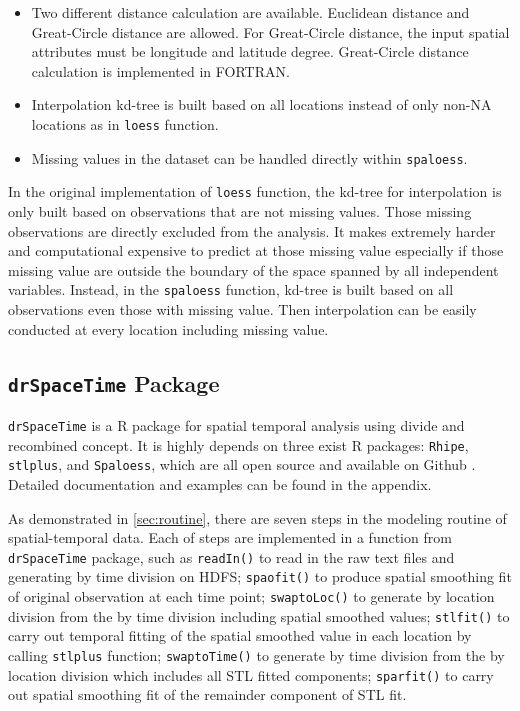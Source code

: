 \begin{itemize}
\item Two different distance calculation are available. Euclidean distance and 
Great-Circle distance are allowed. For Great-Circle distance, the input spatial 
attributes must be longitude and latitude degree. Great-Circle distance 
calculation is implemented in FORTRAN.
\item Interpolation kd-tree is built based on all locations instead of only 
non-NA locations as in \texttt{loess} function. 
\item Missing values in the dataset can be handled directly within 
\texttt{spaloess}. 
\end{itemize}

In the original implementation of \texttt{loess} function, the kd-tree 
\cite{bentley1980multidimensional} for 
interpolation is only built based on observations that are not missing values. 
Those missing observations are directly excluded from the analysis. It makes 
extremely harder and computational expensive to predict at those missing value 
especially if those missing value are outside the boundary of the space spanned
by all independent variables. Instead, in the \texttt{spaloess} function, kd-tree 
is built based on all observations even those with missing value. Then 
interpolation can be easily conducted at every location including missing value.

\subsection{\texttt{drSpaceTime} Package}

\texttt{drSpaceTime} is a R package for spatial temporal analysis using divide 
and recombined concept. It is highly depends on three exist R packages: 
\texttt{Rhipe}, \texttt{stlplus}, and \texttt{Spaloess}, which are all open 
source and available on Github \cite{github}. Detailed documentation and examples
can be found in the appendix.

As demonstrated in \ref{sec:routine}, there are seven steps in the modeling 
routine of spatial-temporal data. Each of steps are implemented in a function
from \texttt{drSpaceTime} package, such as \texttt{readIn()} to read in the raw
text files and generating by time division on HDFS; \texttt{spaofit()} to produce
spatial smoothing fit of original observation at each time point; 
\texttt{swaptoLoc()} to generate by location division from the by time division 
including spatial smoothed values; \texttt{stlfit()} to carry out temporal fitting
of the spatial smoothed value in each location by calling \texttt{stlplus} 
function; \texttt{swaptoTime()} to generate by time division from the by location
division which includes all STL fitted components; \texttt{sparfit()} to 
carry out spatial smoothing fit of the remainder component of STL fit.

